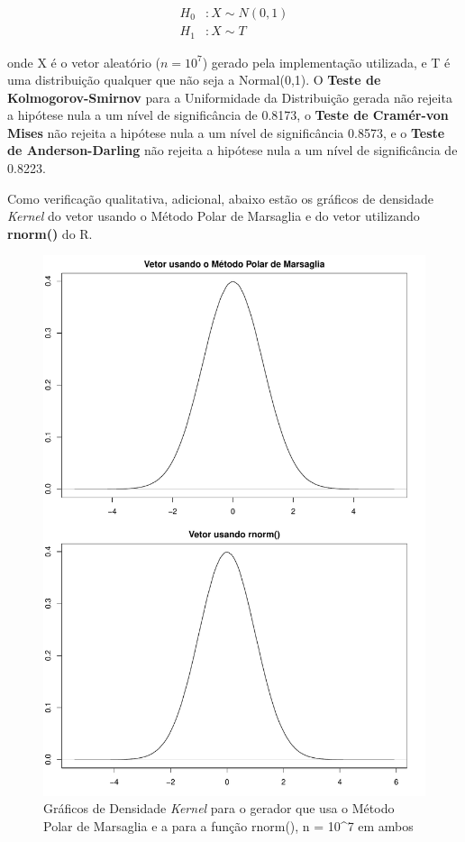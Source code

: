 \documentclass[
	article,			%
	12pt,				%
	twoside,			%
	a4paper,			%
	english,			%
	brazil,				%
	]{abntex2}
\begin{document}
    \begin{align*}
        H_0 & : X \sim N(0,1) \\
        H_1 & : X \sim T
    \end{align*}
    
    onde X é o vetor aleatório  ($n = 10^7$) gerado pela implementação utilizada, e T é uma distribuição qualquer que não seja a Normal(0,1). O \textbf{Teste de Kolmogorov-Smirnov} para a Uniformidade da Distribuição gerada não rejeita a hipótese nula a um nível de significância de 0.8173, o \textbf{Teste de Cramér-von Mises} não rejeita a hipótese nula a um nível de significância 0.8573, e o \textbf{Teste de Anderson-Darling} não rejeita a hipótese nula a um nível de significância de 0.8223. 
    
    Como verificação qualitativa, adicional, abaixo estão os gráficos de densidade \textit{Kernel} do vetor usando o Método Polar de Marsaglia e do vetor utilizando \textbf{rnorm()} do R. 
    
    \begin{figure}[h]
        \centering
        \includegraphics[scale=0.24]{rnorm_polar}
        \caption{Gráficos de Densidade \textit{Kernel} para o gerador que usa o Método Polar de Marsaglia e a para a função rnorm(), n = 10^7 em ambos}
        \label{fig:rnorm_polar}
    \end{figure}
    
    
\end{document}
